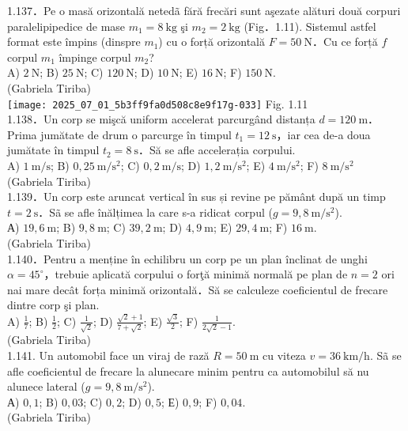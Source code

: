 1.137．Pe o masă orizontală netedã fără frecări sunt aşezate alături două corpuri paralelipipedice de mase $m_{1}=8 \mathrm{~kg}$ şi $m_{2}=2 \mathrm{~kg}$ (Fig．1.11). Sistemul astfel format este împins (dinspre $m_{1}$) cu o forță orizontală $F=50 \mathrm{~N}$．Cu ce forță $f$ corpul $m_{1}$ împinge corpul $m_{2}$?\\ A) $2 \mathrm{~N}$; B) $25 \mathrm{~N}$; C) $120 \mathrm{~N}$; D) $10 \mathrm{~N}$; E) $16 \mathrm{~N}$; F) $150 \mathrm{~N}$.\\ (Gabriela Tiriba)\\ \texttt{[image: 2025\_07\_01\_5b3ff9fa0d508c8e9f17g-033]} Fig. 1.11\\

1.138．Un corp se mişcă uniform accelerat parcurgând distanța $d=120 \mathrm{~m}$．Prima jumătate de drum o parcurge în timpul $t_{1}=12 \mathrm{~s}$，iar cea de-a doua jumătate în timpul $t_{2}=8 \mathrm{~s}$．Să se afle accelerația corpului.\\ A) $1 \mathrm{~m} / \mathrm{s}$; B) $0,25 \mathrm{~m} / \mathrm{s}^{2}$; C) $0,2 \mathrm{~m} / \mathrm{s}$; D) $1,2 \mathrm{~m} / \mathrm{s}^{2}$; E) $4 \mathrm{~m} / \mathrm{s}^{2}$; F) $8 \mathrm{~m} / \mathrm{s}^{2}$\\ (Gabriela Tiriba) \\

1.139．Un corp este aruncat vertical în sus și revine pe pământ după un timp $t=2 \mathrm{~s}$．Sã se afle înălțimea la care s-a ridicat corpul ($g=9,8 \mathrm{~m} / \mathrm{s}^{2}$).\\ А) $19,6 \mathrm{~m}$; B) $9,8 \mathrm{~m}$; C) $39,2 \mathrm{~m}$; D) $4,9 \mathrm{~m}$; E) $29,4 \mathrm{~m}$; F) $16 \mathrm{~m}$.\\ (Gabriela Tiriba)\\

1.140．Pentru a menține în echilibru un corp pe un plan înclinat de unghi $\alpha=45^{\circ}$，trebuie aplicată corpului o forţă minimă normală pe plan de $n=2$ ori nai mare decât forța minimă orizontală．Să se calculeze coeficientul de frecare dintre corp şi plan.\\ A) $\frac{1}{7}$; B) $\frac{1}{2}$; C) $\frac{1}{\sqrt{2}}$; D) $\frac{\sqrt{2}+1}{7+\sqrt{2}}$; E) $\frac{\sqrt{3}}{2}$; F) $\frac{1}{2 \sqrt{2}-1}$. \\ (Gabriela Tiriba)\\

1.141. Un automobil face un viraj de rază $R=50 \mathrm{~m}$ cu viteza $v=36 \mathrm{~km} / \mathrm{h}$. Sã se afle coeficientul de frecare la alunecare minim pentru ca automobilul să nu alunece lateral ($g=9,8 \mathrm{~m} / \mathrm{s}^{2}$).\\ А) $0,1$; B) $0,03$; C) $0,2$; D) $0,5$; Е) $0,9$; F) $0,04$.\\ (Gabriela Tiriba)\\

